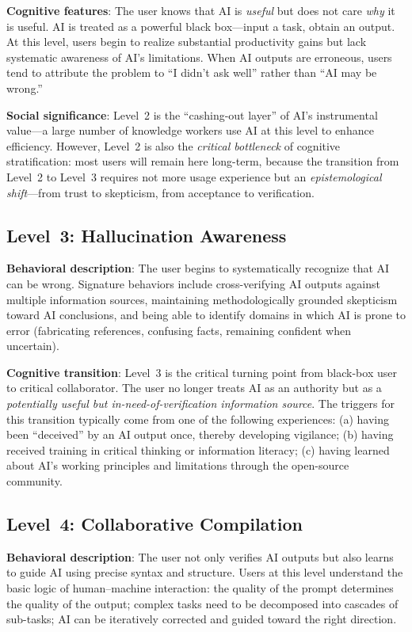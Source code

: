 ﻿\documentclass[12pt,a4paper]{article}
\begin{document}
\textbf{Cognitive features}: The user knows that AI is \textit{useful} but does not care \textit{why} it is useful. AI is treated as a powerful black box---input a task, obtain an output. At this level, users begin to realize substantial productivity gains but lack systematic awareness of AI's limitations. When AI outputs are erroneous, users tend to attribute the problem to ``I didn't ask well'' rather than ``AI may be wrong.''

\textbf{Social significance}: Level~2 is the ``cashing-out layer'' of AI's instrumental value---a large number of knowledge workers use AI at this level to enhance efficiency. However, Level~2 is also the \textit{critical bottleneck} of cognitive stratification: most users will remain here long-term, because the transition from Level~2 to Level~3 requires not more usage experience but an \textit{epistemological shift}---from trust to skepticism, from acceptance to verification.

\subsection{Level~3: Hallucination Awareness}

\textbf{Behavioral description}: The user begins to systematically recognize that AI can be wrong. Signature behaviors include cross-verifying AI outputs against multiple information sources, maintaining methodologically grounded skepticism toward AI conclusions, and being able to identify domains in which AI is prone to error (fabricating references, confusing facts, remaining confident when uncertain).

\textbf{Cognitive transition}: Level~3 is the critical turning point from black-box user to critical collaborator. The user no longer treats AI as an authority but as a \textit{potentially useful but in-need-of-verification information source}. The triggers for this transition typically come from one of the following experiences: (a) having been ``deceived'' by an AI output once, thereby developing vigilance; (b) having received training in critical thinking or information literacy; (c) having learned about AI's working principles and limitations through the open-source community.

\subsection{Level~4: Collaborative Compilation}

\textbf{Behavioral description}: The user not only verifies AI outputs but also learns to guide AI using precise syntax and structure. Users at this level understand the basic logic of human--machine interaction: the quality of the prompt determines the quality of the output; complex tasks need to be decomposed into cascades of sub-tasks; AI can be iteratively corrected and guided toward the right direction.
\end{document}
